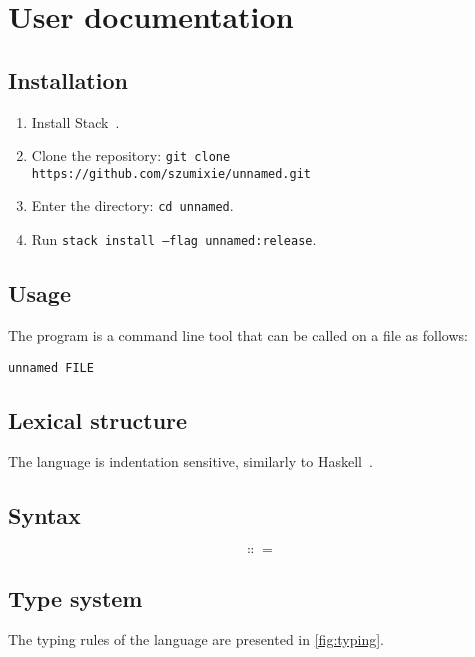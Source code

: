 \chapter{User documentation}\label{ch:userdocs}

\section{Installation}
\begin{enumerate}
  \item Install Stack~\cite{stack}.
  \item Clone the repository:
        \texttt{git clone https://github.com/szumixie/unnamed.git}
  \item Enter the directory: \texttt{cd unnamed}.
  \item Run \texttt{stack install --flag unnamed:release}.
\end{enumerate}

\section{Usage}

The program is a command line tool that can be called on a file as follows:

\begin{verbatim}
unnamed FILE
\end{verbatim}

\section{Lexical structure}



The language is indentation sensitive, similarly to Haskell~\cite{haskell2010}.

\section{Syntax}

\[ \Colon= \]

\section{Type system}

The typing rules of the language are presented in \cref{fig:typing}.

